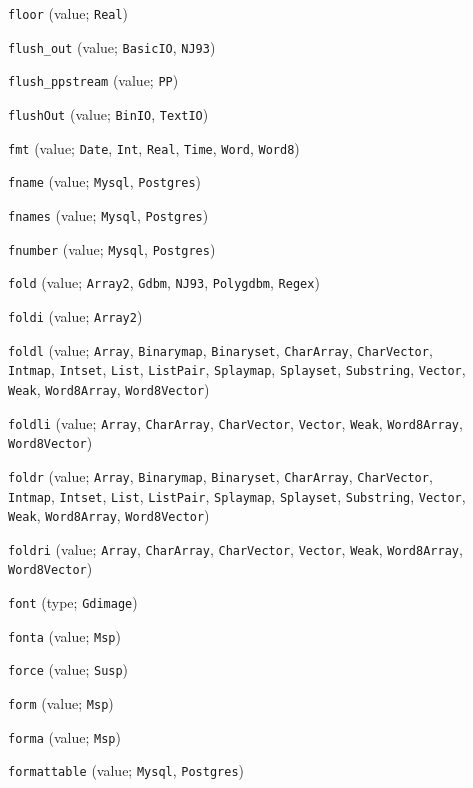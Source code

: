 \begin{description}
\item[] \verb"floor" (value; \verb"Real")
\item[] \verb"flush_out" (value; \verb"BasicIO", \verb"NJ93")
\item[] \verb"flush_ppstream" (value; \verb"PP")
\item[] \verb"flushOut" (value; \verb"BinIO", \verb"TextIO")
\item[] \verb"fmt" (value; \verb"Date", \verb"Int", \verb"Real", \verb"Time", \verb"Word", \verb"Word8")
\item[] \verb"fname" (value; \verb"Mysql", \verb"Postgres")
\item[] \verb"fnames" (value; \verb"Mysql", \verb"Postgres")
\item[] \verb"fnumber" (value; \verb"Mysql", \verb"Postgres")
\item[] \verb"fold" (value; \verb"Array2", \verb"Gdbm", \verb"NJ93", \verb"Polygdbm", \verb"Regex")
\item[] \verb"foldi" (value; \verb"Array2")
\item[] \verb"foldl" (value; \verb"Array", \verb"Binarymap", \verb"Binaryset", \verb"CharArray", \verb"CharVector", \verb"Intmap", \verb"Intset", \verb"List", \verb"ListPair", \verb"Splaymap", \verb"Splayset", \verb"Substring", \verb"Vector", \verb"Weak", \verb"Word8Array", \verb"Word8Vector")
\item[] \verb"foldli" (value; \verb"Array", \verb"CharArray", \verb"CharVector", \verb"Vector", \verb"Weak", \verb"Word8Array", \verb"Word8Vector")
\item[] \verb"foldr" (value; \verb"Array", \verb"Binarymap", \verb"Binaryset", \verb"CharArray", \verb"CharVector", \verb"Intmap", \verb"Intset", \verb"List", \verb"ListPair", \verb"Splaymap", \verb"Splayset", \verb"Substring", \verb"Vector", \verb"Weak", \verb"Word8Array", \verb"Word8Vector")
\item[] \verb"foldri" (value; \verb"Array", \verb"CharArray", \verb"CharVector", \verb"Vector", \verb"Weak", \verb"Word8Array", \verb"Word8Vector")
\item[] \verb"font" (type; \verb"Gdimage")
\item[] \verb"fonta" (value; \verb"Msp")
\item[] \verb"force" (value; \verb"Susp")
\item[] \verb"form" (value; \verb"Msp")
\item[] \verb"forma" (value; \verb"Msp")
\item[] \verb"formattable" (value; \verb"Mysql", \verb"Postgres")

\end{description}
